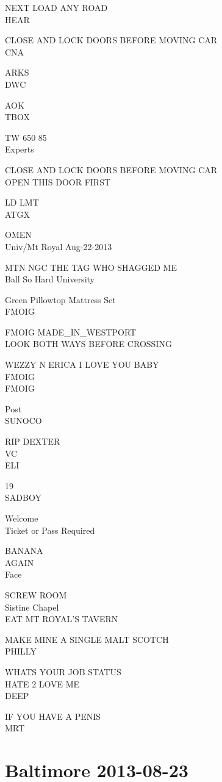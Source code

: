 \documentclass[10pt,letterpaper]{article}
\begin{document}
NEXT LOAD ANY ROAD\\
HEAR

CLOSE AND LOCK DOORS BEFORE MOVING CAR\\
CNA

ARKS\\
DWC

AOK\\
TBOX

TW 650 85\\
Experts

CLOSE AND LOCK DOORS BEFORE MOVING CAR\\
OPEN THIS DOOR FIRST

LD LMT\\
ATGX

OMEN\\
Univ/Mt Royal Aug{-}22{-}2013

MTN NGC THE TAG WHO SHAGGED ME\\
Ball So Hard University

Green Pillowtop Mattress Set\\
FMOIG

FMOIG MADE\_IN\_WESTPORT\\
LOOK BOTH WAYS BEFORE CROSSING

WEZZY N ERICA I LOVE YOU BABY\\
FMOIG\\
FMOIG

Post\\
SUNOCO

RIP DEXTER\\
VC\\
ELI

19\\
SADBOY

Welcome\\
Ticket or Pass Required

BANANA\\
AGAIN\\
Face

SCREW ROOM\\
Sistine Chapel\\
EAT MT ROYAL'S TAVERN

MAKE MINE A SINGLE MALT SCOTCH\\
PHILLY

WHATS YOUR JOB STATUS\\
HATE 2 LOVE ME\\
DEEP

IF YOU HAVE A PENIS\\
MRT
\

\section*{Baltimore 2013-08-23}
\end{document}
